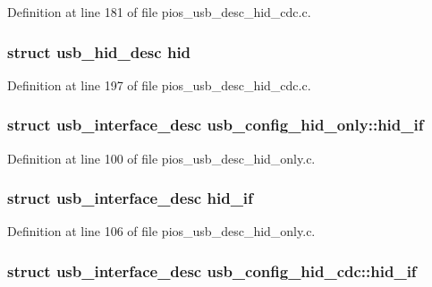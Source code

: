 \-Definition at line 181 of file pios\-\_\-usb\-\_\-desc\-\_\-hid\-\_\-cdc.\-c.

\hypertarget{group___p_i_o_s___u_s_b___d_e_s_c_ga6eb333cd7c6d156f25fa827aa085579c}{
\subsubsection[{hid}]{\setlength{\rightskip}{0pt plus 5cm}struct {\bf usb\-\_\-hid\-\_\-desc} {\bf hid}}}\label{group___p_i_o_s___u_s_b___d_e_s_c_ga6eb333cd7c6d156f25fa827aa085579c}


\-Definition at line 197 of file pios\-\_\-usb\-\_\-desc\-\_\-hid\-\_\-cdc.\-c.

\hypertarget{group___p_i_o_s___u_s_b___d_e_s_c_gab8d4a603dbaaacc357e4beb426cfd094}{
\subsubsection[{hid\-\_\-if}]{\setlength{\rightskip}{0pt plus 5cm}struct {\bf usb\-\_\-interface\-\_\-desc} {\bf usb\-\_\-config\-\_\-hid\-\_\-only\-::hid\-\_\-if}}}\label{group___p_i_o_s___u_s_b___d_e_s_c_gab8d4a603dbaaacc357e4beb426cfd094}


\-Definition at line 100 of file pios\-\_\-usb\-\_\-desc\-\_\-hid\-\_\-only.\-c.

\hypertarget{group___p_i_o_s___u_s_b___d_e_s_c_ga66dd41530dc7e219cf377870362857ce}{
\subsubsection[{hid\-\_\-if}]{\setlength{\rightskip}{0pt plus 5cm}struct {\bf usb\-\_\-interface\-\_\-desc} {\bf hid\-\_\-if}}}\label{group___p_i_o_s___u_s_b___d_e_s_c_ga66dd41530dc7e219cf377870362857ce}


\-Definition at line 106 of file pios\-\_\-usb\-\_\-desc\-\_\-hid\-\_\-only.\-c.

\hypertarget{group___p_i_o_s___u_s_b___d_e_s_c_gadeb93743c31b647e20653e4423233982}{
\subsubsection[{hid\-\_\-if}]{\setlength{\rightskip}{0pt plus 5cm}struct {\bf usb\-\_\-interface\-\_\-desc} {\bf usb\-\_\-config\-\_\-hid\-\_\-cdc\-::hid\-\_\-if}}}\label{group___p_i_o_s___u_s_b___d_e_s_c_gadeb93743c31b647e20653e4423233982}


